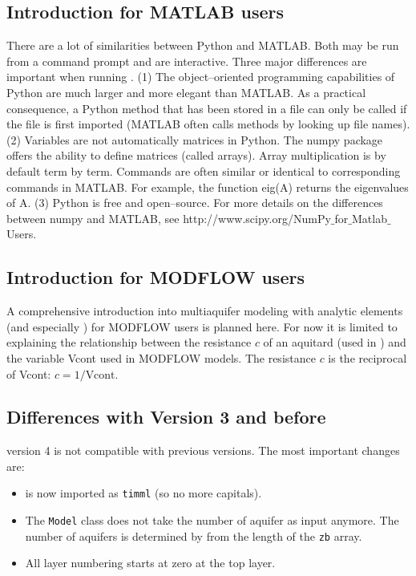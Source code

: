 \documentclass [10pt,letterpaper] {article}
\begin{document}
\subsection{Introduction for MATLAB users} There are a lot of similarities
between Python and MATLAB. Both may be run from a command prompt and are
interactive. Three major differences are important when running \Tim. (1) The
object--oriented programming capabilities of Python are much larger and more
elegant than MATLAB. As a practical consequence, a Python method that has been
stored in a file can only be called if the file is first imported (MATLAB often
calls methods by looking up file names). (2) Variables are not automatically matrices in Python. The
numpy package offers the ability to define matrices (called arrays). Array
multiplication is by default term by term. Commands are often similar or identical to
corresponding commands in MATLAB. For example, the function eig(A)
returns the eigenvalues of A. (3) Python is free and open--source.
For more details on the differences between numpy and MATLAB, see http://www.scipy.org/NumPy$\_$for$\_$Matlab$\_$Users.


\subsection{Introduction for MODFLOW users} A comprehensive introduction into
multiaquifer modeling with analytic elements (and especially \Tim) for MODFLOW
users is planned here. For now it is limited to explaining the relationship
between the resistance $c$ of an aquitard (used in \Tim) and the variable
Vcont used in MODFLOW models. The resistance $c$ is the reciprocal of Vcont:
$c=1/\text{Vcont}$.

\subsection{Differences with Version 3 and before}
\Timsp version 4 is not compatible with previous versions. The most important changes are:
\begin{itemize}
\item \Timsp is now imported as {\tt timml} (so no more capitals).
\item The {\tt Model} class does not take the number of aquifer as input anymore. The number of aquifers is determined by \Timsp from the length of the {\tt zb} array.
\item All layer numbering starts at zero at the top layer.
\end{itemize}
\end{document}
